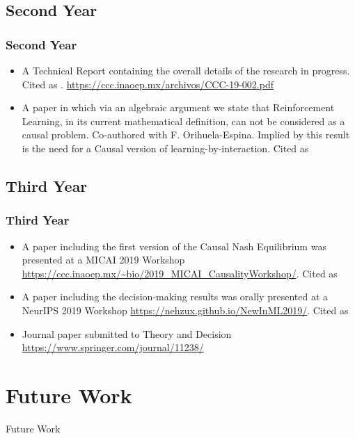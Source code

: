\documentclass{beamer}
\theoremstyle{plain}
\begin{document}
\subsection{Second Year}
\begin{frame}
\frametitle{Second Year}
\begin{itemize}
\item A Technical Report containing the overall details of the research in progress. Cited as \cite{gonzalez2019causal}. \url{https://ccc.inaoep.mx/archivos/CCC-19-002.pdf}
\item A paper in which via an algebraic argument we state that Reinforcement Learning, in its current mathematical definition, can not be considered as a causal problem. Co-authored with F. Orihuela-Espina. Implied by this result is the need for a Causal version of learning-by-interaction. Cited as \cite{gonzalez2019reinforcement}
\end{itemize}
\end{frame}

\subsection{Third Year}
\begin{frame}
\frametitle{Third Year}
\begin{itemize}
\item A paper including the first version of the Causal Nash Equilibrium was presented at a MICAI 2019 Workshop  \url{https://ccc.inaoep.mx/~bio/2019_MICAI_CausalityWorkshop/}. Cited as \cite{gonzalez2019games}
\item A paper including the decision-making results was orally presented at a NeurIPS 2019 Workshop  \url{https://nehzux.github.io/NewInML2019/}. Cited as \cite{gonzalez2019theorems}
\item Journal paper submitted to Theory and Decision  \url{https://www.springer.com/journal/11238/}
\end{itemize}
\end{frame}

\section{Future Work}
\begin{frame}
\begin{center}
\LARGE{Future Work}
\end{center}
\end{frame}
\end{document}
